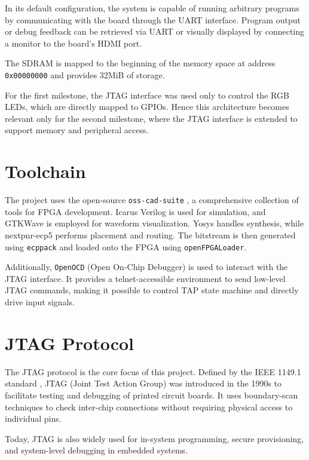 \documentclass[a4paper,11pt,oneside]{report}
\begin{document}
In its default configuration, the system is capable of running arbitrary programs by communicating with the board through the UART interface.
Program output or debug feedback can be retrieved via UART or visually displayed by connecting a monitor to the board’s HDMI port.

The SDRAM is mapped to the beginning of the memory space at address \texttt{0x00000000} and provides 32MiB of storage.

For the first milestone, the JTAG interface was used only to control the RGB LEDs, which are directly mapped to GPIOs. Hence this architecture becomes relevant only for the second milestone,  
where the JTAG interface is extended to support memory and peripheral access.  

\section{Toolchain}
\label{sec:toolchain}

The project uses the open-source \texttt{oss-cad-suite} \cite{noauthor_yosyshq/oss-cad-suite-build_2025}, a comprehensive collection of tools for FPGA development.
Icarus Verilog is used for simulation, and GTKWave is employed for waveform visualization.
Yosys handles synthesis, while nextpnr-ecp5 performs placement and routing.
The bitstream is then generated using \texttt{ecppack} and loaded onto the FPGA using \texttt{openFPGALoader}.

Additionally, \texttt{OpenOCD} (Open On-Chip Debugger) \cite{noauthor_openocd-org/openocd_2025} is used  
to interact with the JTAG interface.  
It provides a telnet-accessible environment to send low-level JTAG commands,  
making it possible to control TAP state machine and directly drive input signals.  


\section{JTAG Protocol}
\label{sec:JTAG}

The JTAG protocol is the core focus of this project.  
Defined by the IEEE 1149.1 standard \cite{ieee1149_1_1990},  
JTAG (Joint Test Action Group) was introduced in the 1990s  
to facilitate testing and debugging of printed circuit boards.  
It uses boundary-scan techniques to check inter-chip connections  
without requiring physical access to individual pins.  

Today, JTAG is also widely used for in-system programming, secure provisioning,  
and system-level debugging in embedded systems.  
\end{document}
